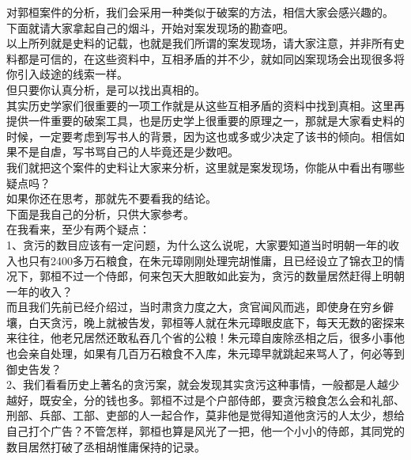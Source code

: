 \begin{multicols}{\theparacolNo}
对郭桓案件的分析，我们会采用一种类似于破案的方法，相信大家会感兴趣的。\\

下面就请大家拿起自己的烟斗，开始对案发现场的勘查吧。\\

以上所列就是史料的记载，也就是我们所谓的案发现场，请大家注意，并非所有史料都是可信的，在这些资料中，互相矛盾的并不少，就如同凶案现场会出现很多将你引入歧途的线索一样。\\

但只要你认真分析，是可以找出真相的。\\

其实历史学家们很重要的一项工作就是从这些互相矛盾的资料中找到真相。这里再提供一件重要的破案工具，也是历史学上很重要的原理之一，那就是大家看史料的时候，一定要考虑到写书人的背景，因为这也或多或少决定了该书的倾向。相信如果不是自虐，写书骂自己的人毕竟还是少数吧。\\

我们就把这个案件的史料让大家来分析，这里就是案发现场，你能从中看出有哪些疑点吗？\\

如果你还在思考，那就先不要看我的结论。\\

下面是我自己的分析，只供大家参考。\\

在我看来，至少有两个疑点：\\

1、贪污的数目应该有一定问题，为什么这么说呢，大家要知道当时明朝一年的收入也只有2400多万石粮食，在朱元璋刚刚处理完胡惟庸，且已经设立了锦衣卫的情况下，郭桓不过一个侍郎，何来包天大胆敢如此妄为，贪污的数量居然赶得上明朝一年的收入？\\

而且我们先前已经介绍过，当时肃贪力度之大，贪官闻风而逃，即使身在穷乡僻壤，白天贪污，晚上就被告发，郭桓等人就在朱元璋眼皮底下，每天无数的密探来来往往，他老兄居然还敢私吞几个省的公粮！朱元璋自废除丞相之后，很多小事他也会亲自处理，如果有几百万石粮食不入库，朱元璋早就跳起来骂人了，何必等到御史告发？\\

2、我们看看历史上著名的贪污案，就会发现其实贪污这种事情，一般都是人越少越好，既安全，分的钱也多。郭桓不过是个户部侍郎，要贪污粮食怎么会和礼部、刑部、兵部、工部、吏部的人一起合作，莫非他是觉得知道他贪污的人太少，想给自己打个广告？不管怎样，郭桓也算是风光了一把，他一个小小的侍郎，其同党的数目居然打破了丞相胡惟庸保持的记录。\\


\end{multicols}
